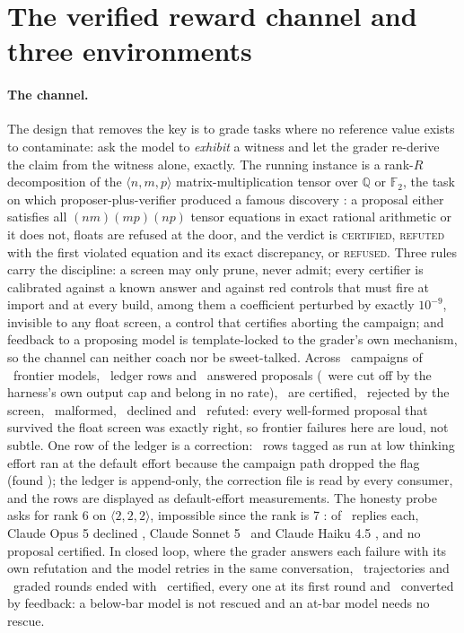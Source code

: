 \documentclass[11pt]{article}
\theoremstyle{definition}
\newcommand{\verdict}[1]{\textsc{#1}}
\begin{document}
\section{The verified reward channel and three environments}\label{sec:envs}

\paragraph{The channel.} The design that removes the key is to grade tasks where no reference value exists to contaminate: ask the model to \emph{exhibit} a witness and let the grader re-derive the claim from the witness alone, exactly. The running instance is a rank-$R$ decomposition of the $\langle n,m,p\rangle$ matrix-multiplication tensor over $\mathbb{Q}$ or $\mathbb{F}_2$, the task on which proposer-plus-verifier produced a famous discovery \cite{Strassen69,Fawzi22}: a proposal either satisfies all $(nm)(mp)(np)$ tensor equations in exact rational arithmetic or it does not, floats are refused at the door, and the verdict is \verdict{certified}, \verdict{refuted} with the first violated equation and its exact discrepancy, or \verdict{refused}. Three rules carry the discipline: a screen may only prune, never admit; every certifier is calibrated against a known answer and against red controls that must fire at import and at every build, among them a coefficient perturbed by exactly $10^{-9}$, invisible to any float screen, a control that certifies aborting the campaign; and feedback to a proposing model is template-locked to the grader's own mechanism, so the channel can neither coach nor be sweet-talked. Across \MmCampaigns\ campaigns of \MmModels\ frontier models, \MmRows\ ledger rows and \MmAnswered\ answered proposals (\MmBudget\ were cut off by the harness's own output cap and belong in no rate), \MmCertified\ are certified, \MmRejected\ rejected by the screen, \MmMalformed\ malformed, \MmDeclined\ declined and \MmRefuted\ refuted: every well-formed proposal that survived the float screen was exactly right, so frontier failures here are loud, not subtle. One row of the ledger is a correction: \MmCorrectionRows\ rows tagged as run at low thinking effort ran at the default effort because the campaign path dropped the flag (found \MmCorrectionFound); the ledger is append-only, the correction file is read by every consumer, and the rows are displayed as default-effort measurements. The honesty probe asks for rank 6 on $\langle2,2,2\rangle$, impossible since the rank is 7 \cite{Winograd71}: of \ProbeN\ replies each, Claude Opus 5 declined \ProbeOpusDeclined, Claude Sonnet 5 \ProbeSonnetDeclined\ and Claude Haiku 4.5 \ProbeHaikuDeclined, and no proposal certified. In closed loop, where the grader answers each failure with its own refutation and the model retries in the same conversation, \LoopTrajectories\ trajectories and \LoopRounds\ graded rounds ended with \LoopCertified\ certified, every one at its first round and \LoopConversions\ converted by feedback: a below-bar model is not rescued and an at-bar model needs no rescue.
\end{document}
